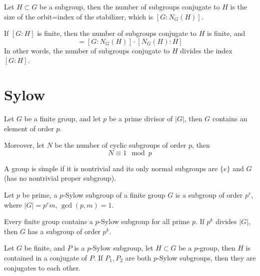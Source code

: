 \documentclass[openany]{book}
\begin{document}
\begin{prop}[*]
    Let $H\subset G$ be a subgroup, then the number of subgroups conjugate to $H$ is the size of the orbit=index of the stabilizer, which is $[G:N_G(H)]$.
\end{prop}


\begin{cor}
    If $[G:H]$ is finite, then the number of subgroups conjugate to $H$ is finite, and 
    \begin{equation*}
        [G:H]=[G:N_G(H)]\cdot[N_G(H): H]
    \end{equation*}
    In other words, the number of subgroups conjugate to $H$ divides the index $[G:H]$.
\end{cor}


\section{Sylow}


\begin{thm}
    Let $G$ be a finite group, and let $p$ be a prime divisor of $|G|$, then $G$ contains an element of order $p$.

    Moreover, let $N$ be the number of cyclic subgroups of order $p$, then 
    \begin{equation*}
        N\equiv 1\mod p
    \end{equation*}
\end{thm}


\begin{defn}[simple]
    A group is simple if it is nontrivial and its only normal subgroups are $\{e\}$ and $G$ (has no nontrivial proper subgroup).
\end{defn}

\begin{defn}
    Let $p$ be prime, a $p$-Sylow subgroup of a finite group $G$ is a subgroup of order $p^r$, where $|G|=p^rm$, $\gcd(p,m)=1$. 
\end{defn}

\begin{thm}[Sylow I]
    Every finite group contains a $p$-Sylow subgroup for all prime $p$. If $p^k$ divides $|G|$, then $G$ has a subgroup of order $p^k$.
\end{thm}

\begin{thm}[Sylow II]
    Let $G$ be finite, and $P$ is a $p$-Sylow subgroup, let $H\subset G$ be a $p$-group, then $H$ is contained in a conjugate of $P$. If $P_1,P_2$ are both $p$-Sylow subgroups, then they are conjugates to each other.
\end{thm}
\end{document}
